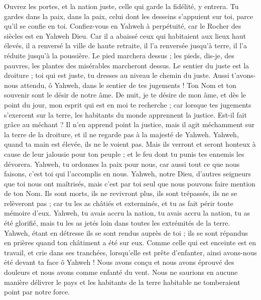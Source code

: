 \begin{multicols}{2}
Ouvrez les portes, et la nation juste, celle qui garde la fidélité, y entrera.
Tu gardes dans la paix, dans la paix, celui dont les desseins s'appuient sur toi, parce qu'il se confie en toi.
Confiez-vous en Yahweh à perpétuité, car le Rocher  des siècles est en Yahweh Dieu.
Car il a abaissé ceux qui habitaient aux lieux haut élevés, il a renversé la ville de haute retraite, il l'a renversée jusqu'à terre, il l'a réduite jusqu'à la poussière.
Le pied marchera dessus ; les pieds, dis-je, des pauvres, les plantes des misérables marcheront dessus.
Le sentier du juste est la droiture ; toi qui est juste, tu dresses au niveau le chemin du juste.
Aussi t'avons-nous attendu, ô Yahweh, dans le sentier de tes jugements ! Ton Nom et ton souvenir sont le désir de notre âme.
De nuit, je te désire de mon âme, et dès le point du jour, mon esprit qui est en moi te recherche ; car lorsque tes jugements s'exercent sur la terre, les habitants du monde apprennent la justice.
Est-il fait grâce au méchant ? Il n'en apprend point la justice, mais il agit méchamment sur la terre de la droiture, et il ne regarde pas à la majesté de Yahweh.
Yahweh, quand ta main est élevée, ils ne le voient pas. Mais ils verront et seront honteux à cause de leur jalousie pour ton peuple ; et le feu dont tu punis tes ennemis les dévorera.
Yahweh, tu ordonnes la paix pour nous, car aussi tout ce que nous faisons, c'est toi qui l'accomplis en nous.
Yahweh, notre Dieu, d'autres seigneurs que toi nous ont maîtrisés, mais c'est par toi seul que nous pouvons faire mention de ton Nom.
Ils sont morts, ils ne revivront plus, ils sont trépassés, ils ne se relèveront pas ; car tu les as châtiés et exterminés, et tu as fait périr toute mémoire d'eux.
Yahweh, tu avais accru la nation, tu avais accru la nation, tu as été glorifié, mais tu les as jetés loin dans toutes les extrémités de la terre.
Yahweh, étant en détresse ils se sont rendus auprès de toi ; ils se sont répandus en prières quand ton châtiment a été sur eux.
Comme celle qui est enceinte est en travail, et crie dans ses tranchées, lorsqu'elle est prête d'enfanter, ainsi avons-nous été devant ta face ô Yahweh !
Nous avons conçu et nous avons éprouvé des douleurs et nous avons comme enfanté du vent. Nous ne saurions en aucune manière délivrer le pays et les habitants de la terre habitable ne tomberaient point par notre force.

\end{multicols}
